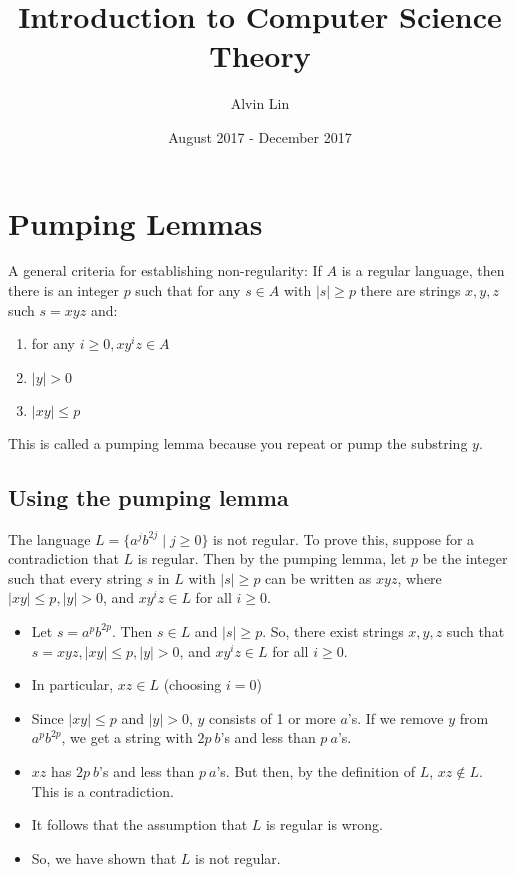 \documentclass{math}
\title{Introduction to Computer Science Theory}
\author{Alvin Lin}
\date{August 2017 - December 2017}
\begin{document}
\maketitle

\section*{Pumping Lemmas}
A general criteria for establishing non-regularity: If \( A \) is a regular
language, then there is an integer \( p \) such that for any \( s\in A \) with
\( |s|\ge p \) there are strings \( x,y,z \) such \( s = xyz \) and:
\begin{enumerate}
  \item for any \( i\ge0, xy^iz\in A \)
  \item \( |y| > 0 \)
  \item \( |xy|\le p \)
\end{enumerate}
This is called a pumping lemma because you repeat or pump the substring \( y \).

\subsection*{Using the pumping lemma}
The language \( L = \{a^jb^{2j}\mid j\ge 0\} \) is not regular. To prove this,
suppose for a contradiction that \( L \) is regular. Then by the pumping lemma,
let \( p \) be the integer such that every string \( s \) in \( L \) with
\( |s|\ge p \) can be written as \( xyz \), where \( |xy|\le p, |y| > 0 \), and
\( xy^iz\in L \) for all \( i\ge0 \).
\begin{itemize}
  \item Let \( s = a^pb^{2p} \). Then \( s\in L \) and \( |s|\ge p \). So, there
  exist strings \( x,y,z \) such that \( s = xyz, |xy|\le p, |y|>0 \), and
  \( xy^iz\in L \) for all \( i\ge0 \).
  \item In particular, \( xz\in L \) (choosing \( i = 0 \))
  \item Since \( |xy|\le p \) and \( |y| > 0 \), \( y \) consists of 1 or more
  \( a \)'s. If we remove \( y \) from \( a^pb^{2p} \), we get a string with
  \( 2p~b \)'s and less than \( p~a \)'s.
  \item \( xz \) has \( 2p~b \)'s and less than \( p~a \)'s. But then, by the
  definition of \( L \), \( xz\notin L \). This is a contradiction.
  \item It follows that the assumption that \( L \) is regular is wrong.
  \item So, we have shown that \( L \) is not regular.
\end{itemize}
\end{document}
